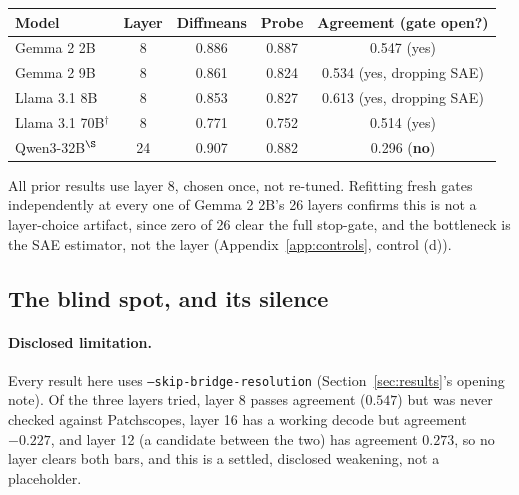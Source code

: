 \documentclass{article}
\begin{document}
\begin{center}
\small
{}
\label{tab:e0-allmodels}
\vspace{1pt}
\begin{tabular}{@{}lcccc@{}}
\toprule
\textbf{Model} & \textbf{Layer} & \textbf{Diffmeans} & \textbf{Probe} & \textbf{Agreement (gate open?)}\\
\midrule
Gemma 2 2B      & 8  & 0.886 & 0.887 & 0.547 (yes)\\
Gemma 2 9B      & 8  & 0.861 & 0.824 & 0.534 (yes, dropping SAE)\\
Llama 3.1 8B    & 8  & 0.853 & 0.827 & 0.613 (yes, dropping SAE)\\
Llama 3.1 70B$^\dagger$ & 8  & 0.771 & 0.752 & 0.514 (yes)\\
Qwen3-32B$^\S$  & 24 & 0.907 & 0.882 & 0.296 (\textbf{no})\\
\bottomrule
\end{tabular}
\end{center}

All prior results use layer 8, chosen once, not re-tuned. Refitting fresh gates independently at
every one of Gemma 2 2B's 26 layers confirms this is not a layer-choice artifact, since zero of 26
clear the full stop-gate, and the bottleneck is the SAE estimator, not the layer
(Appendix~\ref{app:controls}, control (d)).

\subsection{The blind spot, and its silence}
\label{sec:res-blindspot}

\paragraph{Disclosed limitation.} Every result here uses \texttt{--skip-bridge-resolution}
(Section~\ref{sec:results}'s opening note). Of the three layers tried, layer 8 passes agreement
($0.547$) but was never checked against Patchscopes, layer 16 has a working decode but agreement
$-0.227$, and layer 12 (a candidate between the two) has agreement $0.273$, so no layer clears both
bars, and this is a settled, disclosed weakening, not a placeholder.
\end{document}
